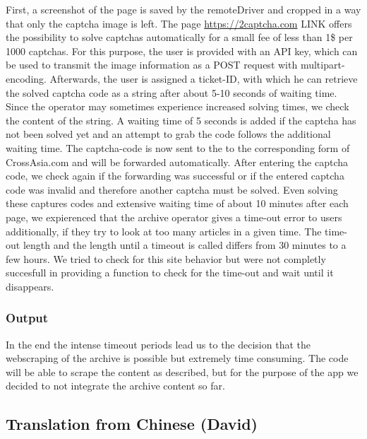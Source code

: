 \documentclass[12pt,a4paper]{article}
\begin{document}
First, a screenshot of the page is saved by the remoteDriver and cropped
in a way that only the captcha image is left. The page
\url{https://2captcha.com} LINK offers the possibility to solve captchas
automatically for a small fee of less than 1\$ per 1000 captchas. For
this purpose, the user is provided with an API key, which can be used to
transmit the image information as a POST request with
multipart-encoding. Afterwards, the user is assigned a ticket-ID, with
which he can retrieve the solved captcha code as a string after about
5-10 seconds of waiting time. Since the operator may sometimes
experience increased solving times, we check the content of the string.
A waiting time of 5 seconds is added if the captcha has not been solved
yet and an attempt to grab the code follows the additional waiting time.
The captcha-code is now sent to the to the corresponding form of
CrossAsia.com and will be forwarded automatically. After entering the
captcha code, we check again if the forwarding was successful or if the
entered captcha code was invalid and therefore another captcha must be
solved. Even solving these captures codes and extensive waiting time of
about 10 minutes after each page, we expierenced that the archive
operator gives a time-out error to users additionally, if they try to
look at too many articles in a given time. The time-out length and the
length until a timeout is called differs from 30 minutes to a few hours.
We tried to check for this site behavior but were not completly
succesfull in providing a function to check for the time-out and wait
until it disappears.

\hypertarget{output}{%
\subsubsection{Output}\label{output}}

In the end the intense timeout periods lead us to the decision that the
webscraping of the archive is possible but extremely time consuming. The
code will be able to scrape the content as described, but for the
purpose of the app we decided to not integrate the archive content so
far.

\hypertarget{translation-from-chinese-david}{%
\subsection{Translation from Chinese
(David)}\label{translation-from-chinese-david}}
\end{document}

